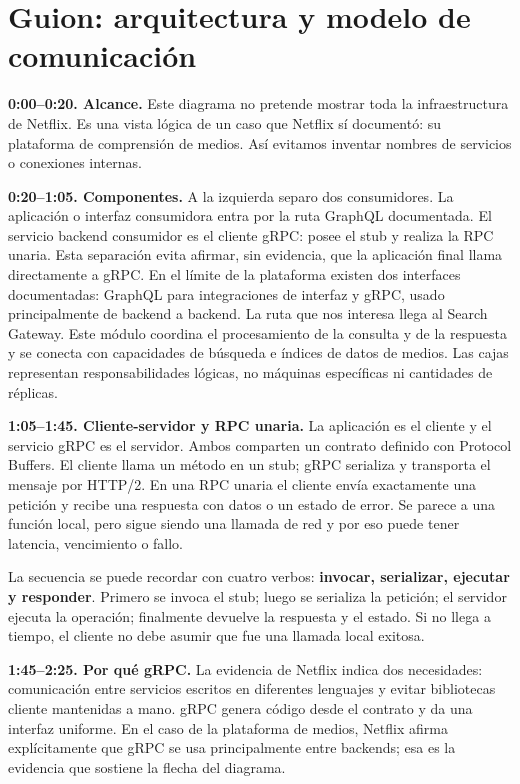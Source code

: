 
\section*{Guion: arquitectura y modelo de comunicación}

\textbf{0:00--0:20. Alcance.}
Este diagrama no pretende mostrar toda la infraestructura de Netflix. Es una
vista lógica de un caso que Netflix sí documentó: su plataforma de comprensión
de medios. Así evitamos inventar nombres de servicios o conexiones internas.

\textbf{0:20--1:05. Componentes.}
A la izquierda separo dos consumidores. La aplicación o interfaz consumidora
entra por la ruta GraphQL documentada. El servicio backend consumidor es el
cliente gRPC: posee el stub y realiza la RPC unaria. Esta separación evita
afirmar, sin evidencia, que la aplicación final llama directamente a gRPC.
En el límite de la plataforma existen dos interfaces documentadas: GraphQL para
integraciones de interfaz y gRPC, usado principalmente de backend a backend.
La ruta que nos interesa llega al Search Gateway. Este módulo coordina el
procesamiento de la consulta y de la respuesta y se conecta con capacidades de
búsqueda e índices de datos de medios. Las cajas representan responsabilidades
lógicas, no máquinas específicas ni cantidades de réplicas.

\textbf{1:05--1:45. Cliente-servidor y RPC unaria.}
La aplicación es el cliente y el servicio gRPC es el servidor. Ambos comparten
un contrato definido con Protocol Buffers. El cliente llama un método en un
stub; gRPC serializa y transporta el mensaje por HTTP/2. En una RPC unaria el
cliente envía exactamente una petición y recibe una respuesta con datos o un
estado de error. Se parece a una función local, pero sigue siendo una llamada de
red y por eso puede tener latencia, vencimiento o fallo.

La secuencia se puede recordar con cuatro verbos: \textbf{invocar, serializar,
ejecutar y responder}. Primero se invoca el stub; luego se serializa la petición;
el servidor ejecuta la operación; finalmente devuelve la respuesta y el estado.
Si no llega a tiempo, el cliente no debe asumir que fue una llamada local exitosa.

\textbf{1:45--2:25. Por qué gRPC.}
La evidencia de Netflix indica dos necesidades: comunicación entre servicios
escritos en diferentes lenguajes y evitar bibliotecas cliente mantenidas a
mano. gRPC genera código desde el contrato y da una interfaz uniforme. En el
caso de la plataforma de medios, Netflix afirma explícitamente que gRPC se usa
principalmente entre backends; esa es la evidencia que sostiene la flecha del
diagrama.

